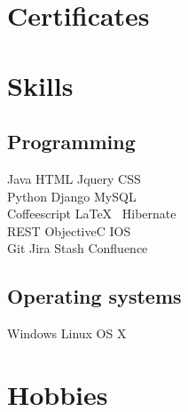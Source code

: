 \documentclass[]{deedy-resume-openfont}
\begin{document}
%
%



%
%

\begin{minipage}[t]{0.33\textwidth} 	
	


\section{Certificates}
\sectionsep



\section{Skills}
\subsection{Programming}
Java \textbullet{}   HTML \textbullet{} Jquery \textbullet{} CSS \\
Python \textbullet{} Django \textbullet{} MySQL \\ 
Coffeescript \textbullet{} \LaTeX\ \textbullet{} Hibernate\\ 
REST \textbullet{} ObjectiveC \textbullet{} IOS \\ 
Git \textbullet{} Jira \textbullet{} Stash \textbullet{} Confluence
\sectionsep

\subsection{Operating systems}
Windows \textbullet{} Linux \textbullet{} OS X 
\sectionsep

\section{Hobbies}
\\
\\
\\
\\
\sectionsep



\end{minipage}
\end{document}

